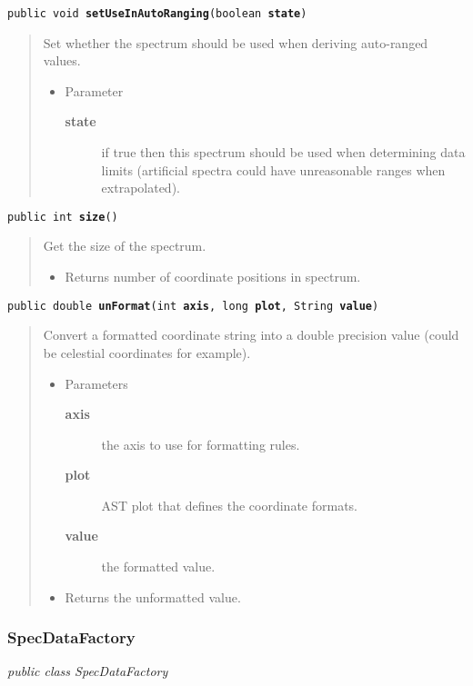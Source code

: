 \documentclass[twoside,11pt,nolof]{starlink}
\providecommand{\startsection}[4]{
   \subsubsection{\label{#3}{#2}}
   #4
}
\providecommand{\method}[1]{\texttt{#1}}
\newenvironment{desc}{\begin{quote}}{\end{quote}}
\begin{document}
\method{public void \textbf{setUseInAutoRanging}(\texttt{boolean} \textbf{state})\label{l117}\label{l118}}
\begin{desc}Set whether the spectrum should be used when deriving
 auto-ranged values.
\begin{itemize}
\item{Parameter
  \begin{description}
   \item[\textbf{state}]{if true then this spectrum should be used when
             determining data limits (artificial spectra could
             have unreasonable ranges when extrapolated).}
  \end{description}}
\end{itemize}
\end{desc}

\method{public int \textbf{size}()\label{l119}\label{l120}}
\begin{desc}Get the size of the spectrum.
\begin{itemize}
\item{Returns number of coordinate positions in spectrum. }
\end{itemize}
\end{desc}

\method{public double \textbf{unFormat}(\texttt{int} \textbf{axis}, \texttt{long} \textbf{plot}, \texttt{String} \textbf{value})\label{l121}\label{l122}}
\begin{desc}Convert a formatted coordinate string into a double precision
 value (could be celestial coordinates for example).
\begin{itemize}
\item{Parameters
  \begin{description}
   \item[\textbf{axis}]{the axis to use for formatting rules.}
   \item[\textbf{plot}]{AST plot that defines the coordinate formats.}
   \item[\textbf{value}]{the formatted value.}
  \end{description}}
\end{itemize}
\begin{itemize}
\item{Returns the unformatted value. }
\end{itemize}
\end{desc}

\startsection{Class}{SpecDataFactory}{l2}

\fbox{\parbox{\textwidth}{
\textit{public
 class SpecDataFactory}
}} %
\end{document}
